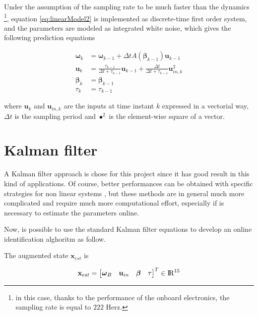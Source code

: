 \noindent Under the assumption of the sampling rate to be much faster than the dynamics \footnote{in this case, thanks to the performance of the onboard electronics, the sampling rate is equal to $222$ Herz.}, equation \eqref{eq:linearModel2} is implemented as discrete-time first order system, and the parameters are modeled as integrated white noise, which gives the following prediction equations

\begin{align}
	\boldsymbol{\omega}_{k} &= \boldsymbol{\omega}_{k-1}+\Delta t A(\boldsymbol{\beta}_{k-1})\mathbf{u}_{k-1} \\
    \mathbf{u}_k &= \frac{\tau_{k-1}}{\Delta t+\tau_{k-1}}\mathbf{u}_{k-1}+\frac{\Delta t}{\Delta t+\tau_{k-1}}\mathbf{u}_{in,k}^2 \\
    \boldsymbol{\beta}_k &= \boldsymbol{\beta}_{k-1} \\
    \tau_k &= \tau_{k-1}
\end{align}

\noindent where $\mathbf{u}_k$ and $\mathbf{u}_{in,k}$ are the inputs at time instant $k$ expressed in a vectorial way, $\Delta t$ is the sampling period and $\bullet^2$ is the element-wise square of a vector.


\section{Kalman filter}
\label{KalmanFilter}

A Kalman filter approach is chose for this project since it has good result in this kind of applications. Of course, better performances can be obtained with specific strategies for non linear systems \cite{parameterIdentification}, but these methods are in general much more complicated and require much more computational effort, especially if is necessary to estimate the parameters online.  

\noindent Now, is possible to use the standard Kalman filter equations \cite{KalmanFilter} to develop an online identification alghoritm as follow.

\noindent The augmented state $\mathbf{x}_{est}$ is

\begin{equation}
	\mathbf{x}_{est}=
	\begin{bmatrix}
		\boldsymbol{\omega}_B & \mathbf{u}_{in} & \boldsymbol{\beta} & \tau
	\end{bmatrix}^T
	\in \rm I\!R^{15}
	\label{eq:augmentedState}
\end{equation} 

